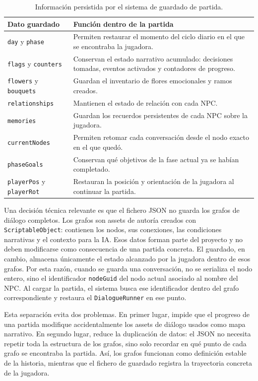 \documentclass[12pt,twoside,titlepage]{report}
\begin{document}
\begin{table}[h]
\centering
\caption{Información persistida por el sistema de guardado de partida.}
\label{tab:save_system_data}
{\footnotesize
\renewcommand{\arraystretch}{1.25}
\begin{tabular}{p{4cm}p{9.5cm}}
\hline
\textbf{Dato guardado} & \textbf{Función dentro de la partida} \\
\hline
\texttt{day} y \texttt{phase} & Permiten restaurar el momento del ciclo diario en el que se encontraba la jugadora. \\
\hline
\texttt{flags} y \texttt{counters} & Conservan el estado narrativo acumulado: decisiones tomadas, eventos activados y contadores de progreso. \\
\hline
\texttt{flowers} y \texttt{bouquets} & Guardan el inventario de flores emocionales y ramos creados. \\
\hline
\texttt{relationships} & Mantienen el estado de relación con cada NPC. \\
\hline
\texttt{memories} & Guardan los recuerdos persistentes de cada NPC sobre la jugadora. \\
\hline
\texttt{currentNodes} & Permiten retomar cada conversación desde el nodo exacto en el que quedó. \\
\hline
\texttt{phaseGoals} & Conservan qué objetivos de la fase actual ya se habían completado. \\
\hline
\texttt{playerPos} y \texttt{playerRot} & Restauran la posición y orientación de la jugadora al continuar la partida. \\
\hline
\end{tabular}
}
\end{table}

Una decisión técnica relevante es que el fichero JSON no guarda los grafos de diálogo completos. Los grafos son assets de autoría creados con \texttt{ScriptableObject}: contienen los nodos, sus conexiones, las condiciones narrativas y el contexto para la IA. Esos datos forman parte del proyecto y no deben modificarse como consecuencia de una partida concreta. El guardado, en cambio, almacena únicamente el estado alcanzado por la jugadora dentro de esos grafos. Por esta razón, cuando se guarda una conversación, no se serializa el nodo entero, sino el identificador \texttt{nodeGuid} del nodo actual asociado al nombre del NPC. Al cargar la partida, el sistema busca ese identificador dentro del grafo correspondiente y restaura el \texttt{DialogueRunner} en ese punto.

Esta separación evita dos problemas. En primer lugar, impide que el progreso de una partida modifique accidentalmente los assets de diálogo usados como mapa narrativo. En segundo lugar, reduce la duplicación de datos: el JSON no necesita repetir toda la estructura de los grafos, sino solo recordar en qué punto de cada grafo se encontraba la partida. Así, los grafos funcionan como definición estable de la historia, mientras que el fichero de guardado registra la trayectoria concreta de la jugadora.
\end{document}
